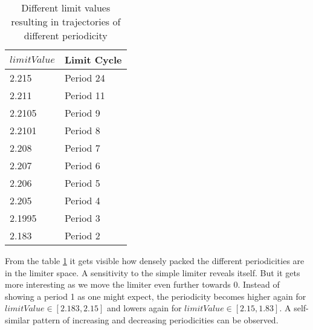 \documentclass[main]{subfiles}
\begin{document}
\begin{comment}
\begin{table}
\center
\begin{tabular}{|l|l|l|l|l|l|l|l|l|l|l|l|l|}
   \hline
   limitValue & 2.215 & 2.211 & 2.2105 & 2.2101 & 2.2101 &  2.208 & 2.207 & 2.206 & 2.205 & 2.1995 & 2.183 \\
   \hline
   Limit Cycle Period & 24 & 11 & 9 & 8 & 7 & 6 & 5 & 4 & 3 & 2 \\
   \hline
\end{tabular}
\caption{Whatever}
\label{table:periodicities}
\end{table}
\end{comment}

\begin{table}
\renewcommand{\arraystretch}{1.2}
\center
\begin{tabular}{@{}ll@{}}
	\toprule
   \(limitValue\) & Limit Cycle\\
   \midrule
   2.215 & Period 24 \\ 
   2.211 & Period 11 \\
   2.2105 & Period 9 \\
   2.2101 & Period 8 \\
   2.208 & Period 7 \\
   2.207 & Period 6 \\
   2.206 & Period 5 \\
   2.205 & Period 4 \\
   2.1995 & Period 3 \\
   2.183 & Period 2 \\
   \bottomrule
\end{tabular}
\caption{Different limit values resulting in trajectories of different periodicity}
\label{table:periodicities}
\end{table}

From the table \ref{table:periodicities} it gets visible how densely packed the different periodicities are in the limiter space. A sensitivity to the simple limiter reveals itself. But it gets more interesting as we move the limiter even further towards 0. Instead of showing a period 1 as one might expect, the periodicity becomes higher again for \(limitValue \in [2.183,2.15]\) and lowers again for \(limitValue \in [2.15,1.83]\). A self-similar pattern of increasing and decreasing periodicities can be observed.

\end{document}
